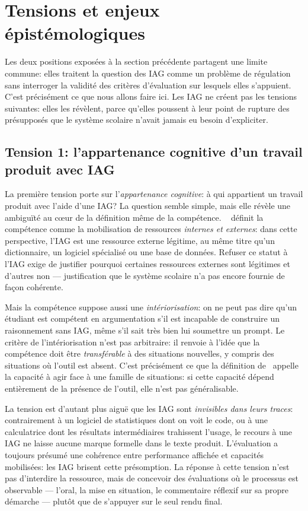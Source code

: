 \section{Tensions et enjeux \'epist\'emologiques}\label{sec:tensions}

Les deux positions exposées à la section précédente partagent une limite commune: elles traitent la question des IAG comme un problème de régulation sans interroger la validité des critères d'évaluation sur lesquels elles s'appuient. 
C'est précisément ce que nous allons faire ici. 
Les IAG ne créent pas les tensions suivantes: elles les révèlent, parce qu'elles poussent à leur point de rupture des présupposés que le système scolaire n'avait jamais eu besoin d'expliciter.


\subsection*{Tension 1: l'appartenance cognitive d'un travail produit avec IAG}

La première tension porte sur l'\emph{appartenance cognitive}: à qui appartient un travail produit avec l'aide d'une IAG?\@
La question semble simple, mais elle révèle une ambiguïté au cœur de la définition même de la compétence.%
~\cite{tardif2006evaluation} définit la compétence comme la mobilisation de ressources \emph{internes et externes}: dans cette perspective, l'IAG est une ressource externe légitime, au même titre qu'un dictionnaire, un logiciel spécialisé ou une base de données. 
Refuser ce statut à l'IAG exige de justifier pourquoi certaines ressources externes sont légitimes et d'autres non --- justification que le système scolaire n'a pas encore fournie de façon cohérente.

Mais la compétence suppose aussi une \emph{intériorisation}: on ne peut pas dire qu'un étudiant est compétent en argumentation s'il est incapable de construire un raisonnement sans IAG, même s'il sait très bien lui soumettre un prompt. 
Le critère de l'intériorisation n'est pas arbitraire: il renvoie à l'idée que la compétence doit être \emph{transférable} à des situations nouvelles, y compris des situations où l'outil est absent.
C'est précisément ce que la définition de~\cite{perrenoud2011construire} appelle la capacité à agir face à une \og{}famille de situations\fg{}: si cette capacité dépend entièrement de la présence de l'outil, elle n'est pas généralisable.

La tension est d'autant plus aiguë que les IAG sont \emph{invisibles dans leurs traces}: contrairement à un logiciel de statistiques dont on voit le code, ou à une calculatrice dont les résultats intermédiaires trahissent l'usage, le recours à une IAG ne laisse aucune marque formelle dans le texte produit.
L'évaluation a toujours présumé une cohérence entre performance affichée et capacités mobilisées: les IAG brisent cette présomption. 
La réponse à cette tension n'est pas d'interdire la ressource, mais de concevoir des évaluations où le processus est observable --- l'oral, la mise en situation, le commentaire réflexif sur sa propre démarche --- plutôt que de s'appuyer sur le seul rendu final.

